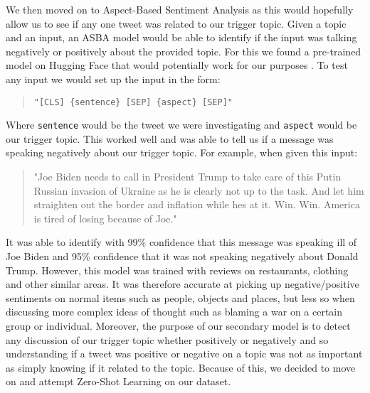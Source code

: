 We then moved on to Aspect-Based Sentiment Analysis as this would hopefully allow us to see if any one tweet was related to our trigger topic. Given a topic and an input, an ASBA model would be able to identify if the input was talking negatively or positively about the provided topic. For this we found a pre-trained model on Hugging Face that would potentially work for our purposes \cite{ABSA}. To test any input we would set up the input in the form: 
\begin{quote}
    \verb|"[CLS] {sentence} [SEP] {aspect} [SEP]"|
\end{quote}
Where \verb|sentence| would be the tweet we were investigating and \verb|aspect| would be our trigger topic. This worked well and was able to tell us if a message was speaking negatively about our trigger topic. For example, when given this input:
\begin{quote}
    "Joe Biden needs to call in President Trump to take care of this Putin Russian invasion of Ukraine as he is clearly not up to the task. And let him straighten out the border and inflation while hes at it. Win. Win. America is tired of losing because of Joe."
\end{quote}
It was able to identify with 99\% confidence that this message was speaking ill of Joe Biden and 95\% confidence that it was not speaking negatively about Donald Trump. However, this model was trained with reviews on restaurants, clothing and other similar areas. It was therefore accurate at picking up negative/positive sentiments on normal items such as people, objects and places, but less so when discussing more complex ideas of thought such as blaming a war on a certain group or individual. Moreover, the purpose of our secondary model is to detect any discussion of our trigger topic whether positively or negatively and so understanding if a tweet was positive or negative on a topic was not as important as simply knowing if it related to the topic. Because of this, we decided to move on and attempt Zero-Shot Learning on our dataset.

